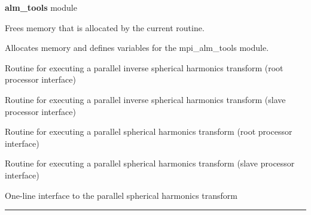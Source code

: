 \begin{modules}
  \begin{sulist}{} %
  \item[\textbf{alm\_tools}] module
  \end{sulist}
\end{modules}

\begin{related}
  \begin{sulist}{} %
   \item[\htmlref{mpi\_cleanup\_alm\_tools}{sub:mpi_cleanup_alm_tools}] Frees memory that is allocated by the current routine. 
   \item[\htmlref{mpi\_initialize\_alm\_tools}{sub:mpi_initialize_alm_tools}] Allocates memory and defines variables for the mpi\_alm\_tools module. 
  \item[\htmlref{mpi\_alm2map}{sub:mpi_alm2map}] Routine for executing a parallel inverse spherical harmonics transform (root processor interface)
  \item[\htmlref{mpi\_alm2map\_slave}{sub:mpi_alm2map_slave}] Routine for executing a parallel inverse spherical harmonics transform (slave processor interface)
  \item[\htmlref{mpi\_map2alm}{sub:mpi_map2alm}] Routine for executing a parallel spherical harmonics transform (root processor interface)
  \item[\htmlref{mpi\_map2alm\_slave}{sub:mpi_map2alm_slave}] Routine for executing a parallel spherical harmonics transform (slave processor interface)
  \item[\htmlref{mpi\_map2alm\_simple}{sub:mpi_map2alm_simple}] One-line interface to the parallel spherical harmonics transform 
  \end{sulist}
\end{related}


\rule{\hsize}{2mm}

\newpage
